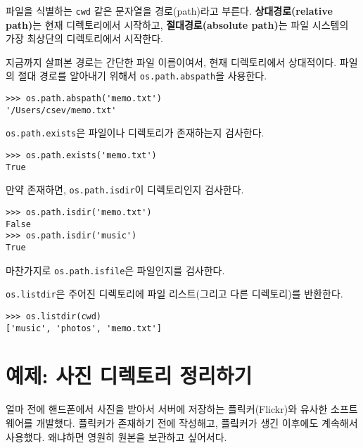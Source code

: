 
파일을 식별하는 {\tt cwd} 같은 문자열을 경로(path)라고 부른다.
{\bf 상대경로(relative path)}는 현재 디렉토리에서 시작하고,
{\bf 절대경로(absolute path)}는 파일 시스템의 가장 최상단의 디렉토리에서 시작한다.


지금까지 살펴본 경로는 간단한 파일 이름이여서, 현재 디렉토리에서 상대적이다.
파일의 절대 경로를 알아내기 위해서 {\tt os.path.abspath}을 사용한다.

\beforeverb
\begin{verbatim}
>>> os.path.abspath('memo.txt')
'/Users/csev/memo.txt'
\end{verbatim}
\afterverb
%

{\tt os.path.exists}은 파일이나 디렉토리가 존재하는지 검사한다.


\beforeverb
\begin{verbatim}
>>> os.path.exists('memo.txt')
True
\end{verbatim}
\afterverb
%

만약 존재하면, {\tt os.path.isdir}이 디렉토리인지 검사한다.

\beforeverb
\begin{verbatim}
>>> os.path.isdir('memo.txt')
False
>>> os.path.isdir('music')
True
\end{verbatim}
\afterverb
%

마찬가지로 {\tt os.path.isfile}은 파일인지를 검사한다.

{\tt os.listdir}은 주어진 디렉토리에 파일 리스트(그리고 다른 디렉토리)를 반환한다.

\beforeverb
\begin{verbatim}
>>> os.listdir(cwd)
['music', 'photos', 'memo.txt']
\end{verbatim}
\afterverb
%


\section{예제: 사진 디렉토리 정리하기}

얼마 전에 핸드폰에서 사진을 받아서 서버에 저장하는 플릭커(Flickr)와 유사한 소프트웨어를 개발했다.
플릭커가 존재하기 전에 작성해고, 플맄커가 생긴 이후에도 계속해서 사용했다.
왜냐하면 영원히 원본을 보관하고 싶어서다.

